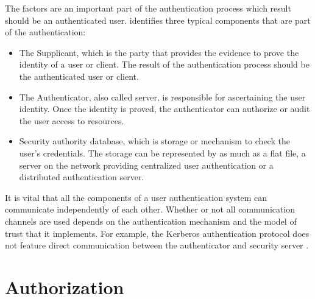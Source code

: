 The factors are an important part of the authentication process which result should be an authenticated user. \citet{Todorov:2007:MUI} identifies three typical components that are part of the authentication:

 \begin{itemize}
 \item The Supplicant, which is the party that provides the evidence to prove the identity of a user or client. The result of the authentication process should be the authenticated user or client.  
 \item The Authenticator, also called server, is responsible for ascertaining the user identity. Once the identity is proved, the authenticator can authorize or audit the user access to resources. 
 \item Security authority database, which is storage or mechanism to check the user's credentials. The storage can be represented by as much as a flat file, a server on the network providing centralized user authentication or a distributed authentication server. 
\end{itemize}

It is vital that all the components of a user authentication system can communicate independently of each other. Whether or not all communication channels are used depends on the authentication mechanism and the model of trust that it implements. For example, the Kerberos authentication protocol does not feature direct communication between the authenticator and security server \cite{Todorov:2007:MUI}. 



\section{Authorization}

\chapterend